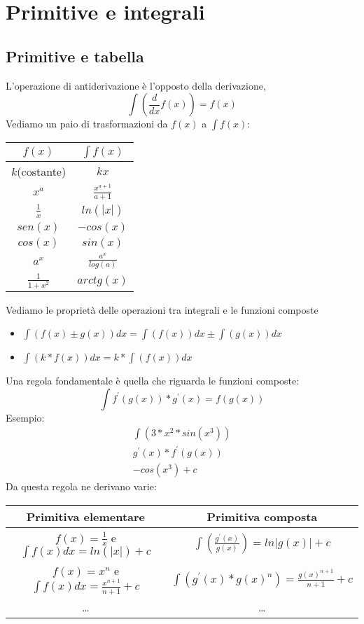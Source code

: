\documentclass[11pt]{article}
\begin{document}
\section{Primitive e integrali}
\subsection{Primitive e tabella}
L'operazione di antiderivazione è l'opposto della derivazione, $$\int(\frac{d}{dx}f(x)) = f(x)$$ Vediamo un paio di trasformazioni da $f(x)$ a $\int f(x)$:
\begin{center}
    \begin{tabular}{|c|c|}
        \hline
        $f(x)$ & $\int f(x)$\\
        \hline\hline
        $k$(costante) & $kx$\\
        \hline
        $x^{a}$ & $\frac{x^{a+1}}{a+1}$\\
        \hline
        $\frac{1}{x}$ & $ln(|x|)$\\
        \hline
        $sen(x)$ & $-cos(x)$\\
        \hline
        $cos(x)$ & $sin(x)$\\
        \hline
        $a^{x}$ & $\frac{a^{x}}{log(a)}$\\
        \hline
        $\frac{1}{1+x^{2}}$ & $arctg(x)$\\
        \hline
    \end{tabular}
\end{center}
Vediamo le proprietà delle operazioni tra integrali e le funzioni composte
\begin{center}
    \begin{itemize}
        \item $\int(f(x) \pm g(x))dx = \int(f(x))dx \pm \int(g(x))dx$
        \item $\int(k*f(x))dx = k*\int(f(x))dx$
    \end{itemize}
\end{center}
Una regola fondamentale è quella che riguarda le funzioni composte:
$$\int f^{'}(g(x)) * g^{'}(x) = f(g(x))$$
Esempio:
\begin{align*}
    \int(3*x^{2} * sin(x^{3}))\\
    g^{'}(x) * f^{'}(g(x))\\
    -cos(x^{3}) + c
\end{align*}
Da questa regola ne derivano varie:\\
\begin{tabular}{|c|c|}
    \hline
    Primitiva elementare & Primitiva composta\\
    \hline\hline
    $f(x) = \frac{1}{x}$ e $\int f(x)dx = ln(|x|) + c$ & $\int(\frac{g^{'}(x)}{g(x)}) = ln|g(x)| + c$\\
    \hline
    $f(x) = x^{n}$ e $\int f(x)dx = \frac{x^{n+1}}{n+1} + c$ & $\int(g^{'}(x)*g(x)^{n}) = \frac{g(x)^{n+1}}{n+1}  + c$\\
    \hline
    \dots & \dots\\
    \hline
\end{tabular}
\end{document}
